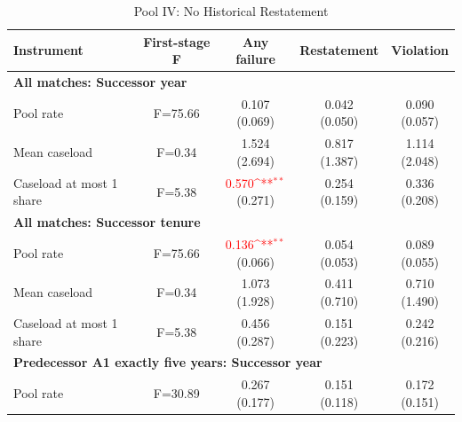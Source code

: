 \begin{table}[htbp]
\footnotesize
\def\sym#1{\ifmmode^{#1}\else\(^{#1}\)\fi}
\centering
\caption{Pool IV: No Historical Restatement}
\begin{threeparttable}
\begin{tabular}{p{}cccc}
\toprule
Instrument & First-stage F & Any failure & Restatement & Violation \\
\midrule
\multicolumn{5}{l}{\textbf{All matches: Successor year}} \\
Pool rate & F=75.66 & \shortstack{0.107\\(0.069)} & \shortstack{0.042\\(0.050)} & \shortstack{0.090\\(0.057)} \\
Mean caseload & F=0.34 & \shortstack{1.524\\(2.694)} & \shortstack{0.817\\(1.387)} & \shortstack{1.114\\(2.048)} \\
Caseload at most 1 share & F=5.38 & \shortstack{\textcolor{red}{0.570\sym{**}}\\(0.271)} & \shortstack{0.254\\(0.159)} & \shortstack{0.336\\(0.208)} \\
\multicolumn{5}{l}{\textbf{All matches: Successor tenure}} \\
Pool rate & F=75.66 & \shortstack{\textcolor{red}{0.136\sym{**}}\\(0.066)} & \shortstack{0.054\\(0.053)} & \shortstack{0.089\\(0.055)} \\
Mean caseload & F=0.34 & \shortstack{1.073\\(1.928)} & \shortstack{0.411\\(0.710)} & \shortstack{0.710\\(1.490)} \\
Caseload at most 1 share & F=5.38 & \shortstack{0.456\\(0.287)} & \shortstack{0.151\\(0.223)} & \shortstack{0.242\\(0.216)} \\
\multicolumn{5}{l}{\textbf{Predecessor A1 exactly five years: Successor year}} \\
Pool rate & F=30.89 & \shortstack{0.267\\(0.177)} & \shortstack{0.151\\(0.118)} & \shortstack{0.172\\(0.151)} \\

\end{tabular}
\end{threeparttable}
\end{table}
